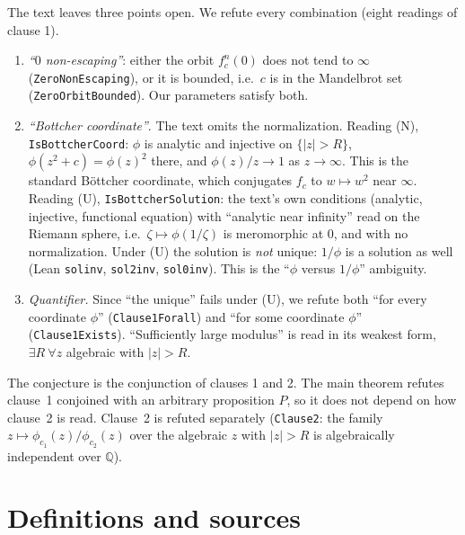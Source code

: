 \documentclass[11pt]{article}
\theoremstyle{definition}
\theoremstyle{remark}
\renewcommand{\_}{\oldus\allowbreak}
\begin{document}
The text leaves three points open. We refute every combination (eight readings of clause 1).
\begin{enumerate}[label=(R\arabic*)]
\item \emph{``$0$ non-escaping''}: either the orbit $f_c^{n}(0)$ does not tend to $\infty$
  (\texttt{ZeroNonEscaping}), or it is bounded, i.e.\ $c$ is in the Mandelbrot set
  (\texttt{ZeroOrbitBounded}). Our parameters satisfy both.
\item \emph{``Bottcher coordinate''}. The text omits the normalization. Reading (N),
  \texttt{IsBottcherCoord}: $\phi$ is analytic and injective on $\{|z|>R\}$, $\phi(z^2+c)=\phi(z)^2$ there,
  and $\phi(z)/z\to1$ as $z\to\infty$. This is the standard B\"ottcher coordinate, which conjugates $f_c$ to
  $w\mapsto w^2$ near $\infty$. Reading (U), \texttt{IsBottcherSolution}: the text's own conditions
  (analytic, injective, functional equation) with ``analytic near infinity'' read on the Riemann sphere,
  i.e.\ $\zeta\mapsto\phi(1/\zeta)$ is meromorphic at $0$, and with no normalization. Under (U) the
  solution is \emph{not} unique: $1/\phi$ is a solution as well (Lean \texttt{sol\_inv}, \texttt{sol2\_inv},
  \texttt{sol0\_inv}). This is the ``$\phi$ versus $1/\phi$'' ambiguity.
\item \emph{Quantifier.} Since ``the unique'' fails under (U), we refute both ``for every coordinate
  $\phi$'' (\texttt{Clause1Forall}) and ``for some coordinate $\phi$'' (\texttt{Clause1Exists}).
  ``Sufficiently large modulus'' is read in its weakest form, $\exists R\ \forall z$ algebraic with $|z|>R$.
\end{enumerate}
The conjecture is the conjunction of clauses 1 and 2. The main theorem refutes clause~1 conjoined
with an arbitrary proposition $P$, so it does not depend on how clause~2 is read. Clause~2 is
refuted separately (\texttt{Clause2}: the family $z\mapsto\phi_{c_1}(z)/\phi_{c_2}(z)$ over the algebraic
$z$ with $|z|>R$ is algebraically independent over $\mathbb{Q}$).

\section{Definitions and sources}
\end{document}
